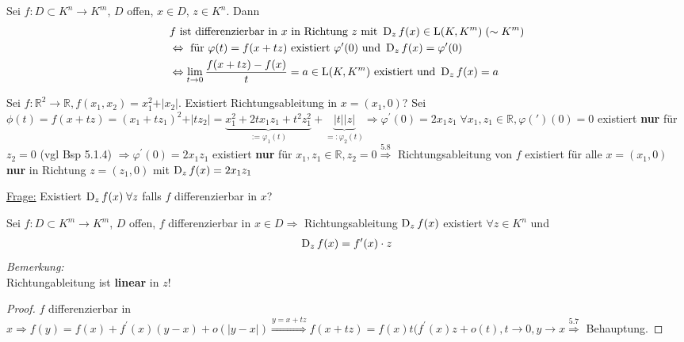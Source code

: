 \begin{folgerung}
    Sei $f: D \subset K^n \to K^m$, $D$ offen, $x\in D$, $z \in K^n$. Dann
    \begin{align} %
    &f \text{ ist differenzierbar in } x \text{ in Richtung } z \text{ mit } \Diff_z f(x) \in \LinAbb(K, K^m)\;(\sim K^m)\\
    &\Leftrightarrow \text{ für } \varphi(t) = f(x + tz) \text{ existiert } \varphi^{\prime}(0) \text{ und } \Diff_z f(x) = \varphi^{\prime}(0)\\
    &\Leftrightarrow \lim_{t \to 0} \frac{f(x + tz) - f(x)}{t} = a \in \LinAbb(K,K^m) \text{ existiert und } \Diff_z f(x) = a
    \end{align}
\end{folgerung}

\begin{beispiel}
    Sei $f: \mathbb{R}^2 \to \mathbb{R}, f(x_1,x_2) = x_1^2 + \vert x_2\vert$. Existiert Richtungsableitung in $x=(x_1,0)$? Sei $\phi(t) = f(x + tz) = (x_1 + tz_1)^2 + \vert tz_2\vert = \underbrace{x_1^2 + 2tx_1 z_1 +  t^2 z_1^2}_{:= \varphi_1(t)} + \underbrace{\vert t \vert \vert z \vert}_{=: \varphi_2(t)} \Rightarrow \varphi^{\prime}(0) = 2x_1z_1\;\forall x_1, z_1 \in \mathbb{R}, \varphi(\prime)(0) = 0$ existiert \textbf{nur} für $z_2 = 0$ (vgl Bsp 5.1.4) %
    $\Rightarrow \varphi^{\prime}(0) = 2x_1 z_1$ existiert \textbf{nur} für $x_1, z_1 \in \mathbb{R}, z_2 = 0 \overset{5.8}{\Rightarrow}$ Richtungsableitung von $f$ existiert für alle $x=(x_1,0)$ \textbf{nur} in Richtung $z=(z_1,0)$ mit $\operatorname{D}_z f(x) = 2x_1 z_1$
\end{beispiel}

\underline{Frage:} Existiert $\operatorname{D}_z f(x)\; \forall z$ falls $f$ differenzierbar in $x$?

\begin{satz}\label{satz:Richtungsableitung_linear}
    Sei $f : D \subset K^m \to K^m$, $D$ offen, $f$ differenzierbar in $x \in D \Rightarrow$ Richtungsableitung $\operatorname{D}_z f(x)$ existiert $\forall z \in K^n$ und 
    \begin{align}
    \operatorname{D}_z f(x) = f^{\prime}(x)\cdot z
    \end{align}
    \textit{Bemerkung:}\\
    Richtungableitung ist \textbf{linear} in $z$!
\end{satz}

\begin{proof}
    $f$ differenzierbar in $x \Rightarrow f(y) = f(x) + f^{\prime}(x)(y-x) + o(\vert y-x\vert) \overset{y=x+tz}{\Rightarrow} f(x+tz) = f(x) t(f^{\prime}(x)z + o(t), t \to 0, y \to x \overset{5.7}{\Rightarrow}$ Behauptung.
\end{proof}

